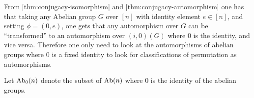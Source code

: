 \begin{remark}
    From \autoref{thm:conjugacy-isomorphism} and \autoref{thm:conjugacy-automorphism} one has that taking any Abelian group \( G \) over \( [n] \) with identity element \( e \in [n] \), and setting \( \phi = (0, e) \), one gets that any automorphism over \( G \) can be ``transformed'' to an automorphism over \( (i, 0)(G) \) where \( 0 \) is the identity, and vice versa. Therefore one only need to look at the automorphisms of abelian groups where \( 0 \) is a fixed identity to look for classifications of permutation as automorphisms.
\end{remark}

\begin{definition}
    Let \( \operatorname{Ab}_0(n) \) denote the subset of \( \operatorname{Ab}(n) \) where \( 0 \) is the identity of the abelian groups.
\end{definition}

